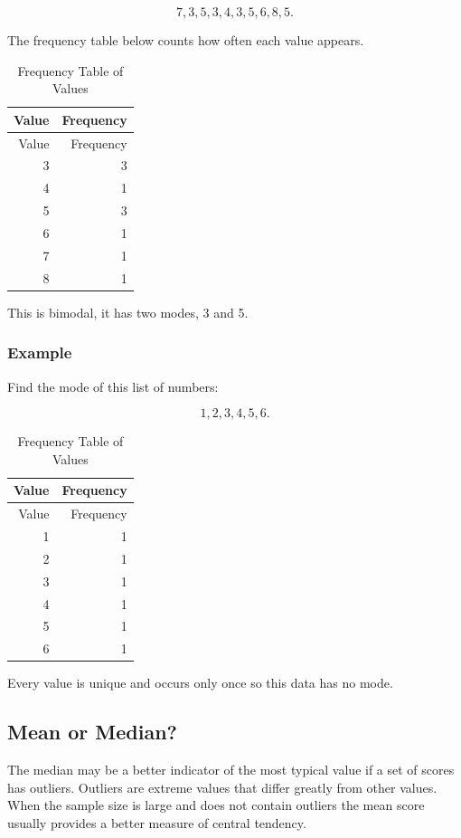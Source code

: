 \documentclass[
]{book}
\begin{document}
\[ 7, 3, 5, 3, 4, 3, 5, 6, 8, 5.\]

The frequency table below counts how often each value appears.

\begin{longtable}[]{@{}rr@{}}
\caption{\label{tab:table195} Frequency Table of Values}\tabularnewline
\toprule
Value & Frequency \\
\midrule
\endfirsthead
\toprule
Value & Frequency \\
\midrule
\endhead
3 & 3 \\
4 & 1 \\
5 & 3 \\
6 & 1 \\
7 & 1 \\
8 & 1 \\
\bottomrule
\end{longtable}

This is bimodal, it has two modes, 3 and 5.

\hypertarget{example-5}{%
\subsubsection{Example}\label{example-5}}

Find the mode of this list of numbers:

\[ 1, 2, 3, 4, 5, 6.\]

\begin{longtable}[]{@{}rr@{}}
\caption{\label{tab:table4} Frequency Table of Values}\tabularnewline
\toprule
Value & Frequency \\
\midrule
\endfirsthead
\toprule
Value & Frequency \\
\midrule
\endhead
1 & 1 \\
2 & 1 \\
3 & 1 \\
4 & 1 \\
5 & 1 \\
6 & 1 \\
\bottomrule
\end{longtable}

Every value is unique and occurs only once so this data has no mode.

\hypertarget{mean-or-median}{%
\subsection{Mean or Median?}\label{mean-or-median}}

The median may be a better indicator of the most typical value if a set of scores has outliers. Outliers are extreme values that differ greatly from other values. When the sample size is large and does not contain outliers the mean score usually provides a better measure of central tendency.
\end{document}
